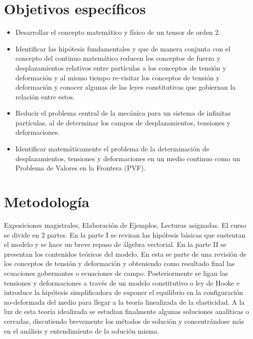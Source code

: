 \section*{Objetivos específicos}
%
\begin{itemize}
%
	\item Desarrollar el concepto matemático y físico de un tensor de orden 2. 
	\item Identificar las hipótesis fundamentales y que de manera conjunta con el concepto del continuo matemático reducen los conceptos de fuerza y desplazamientos relativos entre partículas a los conceptos de tensión y deformación y al mismo tiempo re-visitar los conceptos de tensión y deformación y conocer algunas de las leyes constitutivas que gobiernan la relación entre estos.
	\item Reducir el problema central de la mecánica para un sistema de infinitas partículas, al de determinar los campos de desplazamientos, tensiones y deformaciones.
	\item Identificar matemáticamente el problema de la determinación de desplazamientos, tensiones y deformaciones en un medio continuo como un Problema de Valores en la Frontera (PVF).
%
\end{itemize}
%
\section*{Metodología}
%
Exposiciones magistrales, Elaboración de Ejemplos, Lecturas asignadas. El curso se divide en 2 partes.  En la parte I se revisan las hipótesis básicas que sustentan el modelo y se hace un breve repaso de álgebra vectorial. En la parte II se presentan los contenidos teóricos del modelo. En esta se parte de una revisión de los conceptos de tensión y deformación y obteniendo como resultado final las ecuaciones gobernantes o ecuaciones de campo.  Posteriormente se ligan las tensiones y deformaciones a través de un modelo constitutivo o ley de Hooke e introduce la hipótesis simplificadora de suponer el equilibrio en la configuración no-deformada del medio para llegar a la teoría linealizada de la elasticidad.  A la luz de esta teoría idealizada se estudian finalmente algunas soluciones analíticas o cerradas, discutiendo brevemente los métodos de solución y concentrándose más en el análisis y entendimiento de la solución misma.
%
%
